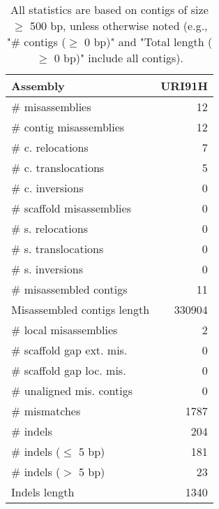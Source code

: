 \documentclass[12pt,a4paper]{article}
\begin{document}
\begin{table}[ht]
\begin{center}
\caption{All statistics are based on contigs of size $\geq$ 500 bp, unless otherwise noted (e.g., "\# contigs ($\geq$ 0 bp)" and "Total length ($\geq$ 0 bp)" include all contigs).}
\begin{tabular}{|l*{1}{|r}|}
\hline
Assembly & URI91H \\ \hline
\# misassemblies & 12 \\ \hline
\hspace{2mm}\# contig misassemblies & 12 \\ \hline
\hspace{5mm}\# c. relocations & 7 \\ \hline
\hspace{5mm}\# c. translocations & 5 \\ \hline
\hspace{5mm}\# c. inversions & 0 \\ \hline
\hspace{2mm}\# scaffold misassemblies & 0 \\ \hline
\hspace{5mm}\# s. relocations & 0 \\ \hline
\hspace{5mm}\# s. translocations & 0 \\ \hline
\hspace{5mm}\# s. inversions & 0 \\ \hline
\# misassembled contigs & 11 \\ \hline
Misassembled contigs length & 330904 \\ \hline
\# local misassemblies & 2 \\ \hline
\# scaffold gap ext. mis. & 0 \\ \hline
\# scaffold gap loc. mis. & 0 \\ \hline
\# unaligned mis. contigs & 0 \\ \hline
\# mismatches & 1787 \\ \hline
\# indels & 204 \\ \hline
\hspace{5mm}\# indels ($\leq$ 5 bp) & 181 \\ \hline
\hspace{5mm}\# indels ($>$ 5 bp) & 23 \\ \hline
Indels length & 1340 \\ \hline
\end{tabular}
\end{center}
\end{table}
\end{document}
